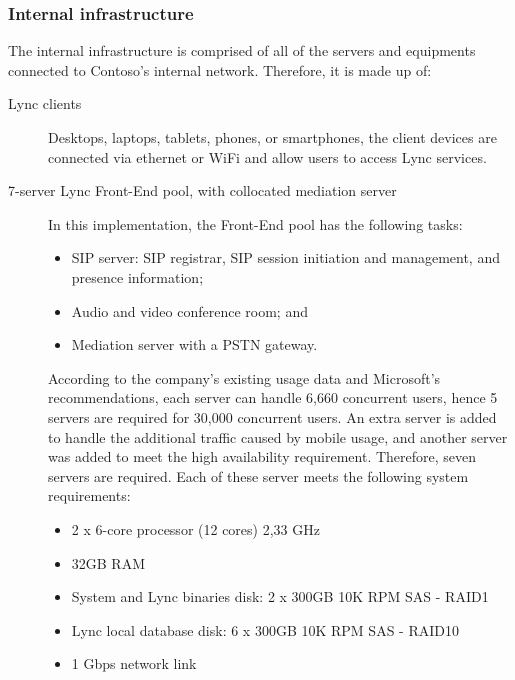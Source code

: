 	\subsubsection{Internal infrastructure}
	The internal infrastructure is comprised of all of the servers and equipments connected to Contoso's internal network.
	Therefore, it is made up of:
	\begin{description}
		\item[Lync clients] Desktops, laptops, tablets, phones, or smartphones, the client devices are connected via ethernet or WiFi and allow users to access Lync services.
		
		\item[7-server Lync Front-End pool, with collocated mediation server] In this implementation, the Front-End pool has the following tasks:
			\begin{itemize}
				\item SIP server: SIP registrar, SIP  session initiation and management,  and presence information;
				\item Audio and video conference room; and
				\item Mediation server with a PSTN gateway.
			\end{itemize}
		According to the company's existing usage data and Microsoft's recommendations, each server can handle 6,660 concurrent users, hence 5 servers are required for 30,000 concurrent users. An extra server is added to handle the additional traffic caused by mobile usage, and another server was added  to meet the high availability requirement. Therefore, seven servers are required. Each of these server meets the following system requirements:
		\begin{itemize}
			\item 2 x 6-core processor (12 cores)  2,33 GHz
			\item 32GB RAM
			\item System and Lync binaries disk: 2 x 300GB 10K RPM SAS - RAID1
			\item Lync local database disk: 6 x 300GB 10K RPM SAS - RAID10
			\item 1 Gbps network link
		\end{itemize}
		

\end{description}
